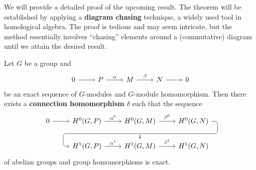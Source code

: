 We will provide a detailed proof of the upcoming result. 
The theorem will be established by applying a \textbf{diagram chasing} technique, a widely used tool in homological algebra.
The proof is tedious and may seem intricate, but the method essentially 
involves ``chasing'' elements around a (commutative) diagram until we attain the desired result. 

\begin{theorem}
Let $G$ be a group and 
\[
\begin{tikzcd}
    0 & P & M & N & 0
    \arrow[from=1-1, to=1-2]
    \arrow["\alpha", from=1-2, to=1-3]
    \arrow["\beta", from=1-3, to=1-4]
    \arrow[from=1-4, to=1-5]
    \end{tikzcd}
\] 
be an exact sequence of $G$-modules and $G$-module homomorphism. 
Then there exists a \textbf{connection homomorphism} $\delta$ such that the sequence 
\begin{equation}
\label{eq:long}
\begin{tikzcd}
 0\rar & H^0(G,P)\rar["\alpha^0"] & H^0(G,M) \rar["\beta^0"]
             \ar[draw=none]{d}[name=X, anchor=center]{}
    & H^0(G,N) \ar[rounded corners,
            to path={ -- ([xshift=2ex]\tikztostart.east)
                      |- (X.center) \tikztonodes
                      -| ([xshift=-2ex]\tikztotarget.west)
                      -- (\tikztotarget)}]{dll}[at end]{\delta} \\      
  &H^1(G,P) \rar["\alpha^1"] & H^1(G,M) \rar["\beta^1"] & H^1(G,N)
\end{tikzcd}
\end{equation}
of abelian groups
and group homomorphisms is exact. 
\end{theorem}

